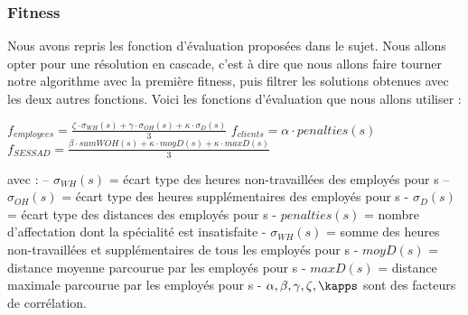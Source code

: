 \documentclass{article}
\begin{document}
        \subsubsection{Fitness}
        Nous avons repris les fonction d'évaluation proposées dans le sujet. Nous allons opter pour une résolution en cascade, c'est à dire que nous allons faire tourner notre algorithme avec la première fitness, puis filtrer les solutions obtenues avec les deux autres fonctions.
        Voici les fonctions d'évaluation que nous allons utiliser : 
        \begin{center}
        \begin{Large}
        \newline
        $f_{employees} = \frac{\zeta \cdot \sigma_{WH}(s)+ \gamma \cdot \sigma_{OH}(s) + \kappa \cdot \sigma_D(s)}{3}$
        \newline
        \bigskip
        $f_{clients} = \alpha \cdot penalties(s)$
        \newline
        \bigskip
        $f_{SESSAD} = \frac{\beta \cdot sumWOH(s) + \kappa \cdot moyD(s) + \kappa \cdot maxD(s) }{3} $
        \end{Large}
        \end{center}
        \newline 
        avec :
        \newline
        – $\sigma_{WH}(s)$ = écart type des heures non-travaillées des employés pour s
        \newline
        – $\sigma_{OH}(s)$ = écart type des heures supplémentaires des employés pour s
        \newline
        - $\sigma_{D}(s)$ = écart type des distances des employés pour s
        \newline
        - $penalties(s)$ = nombre d'affectation dont la spécialité est insatisfaite
        \newline
        - $\sigma_{WH}(s)$ = somme des heures non-travaillées et supplémentaires de tous les employés pour s
        \newline
        -  $moyD(s)$ = distance moyenne parcourue par les employés pour s
        \newline 
        - $maxD(s)$ = distance maximale parcourue par les employés pour s
        \newline
        - $ \alpha, \beta, \gamma, \zeta, \kapps$ sont des facteurs de corrélation.
\end{document}
